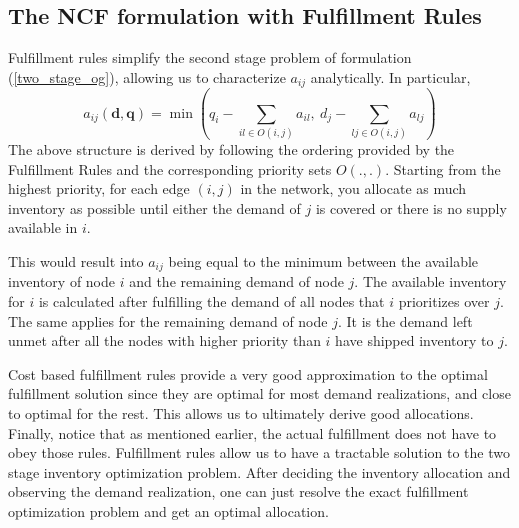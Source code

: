 \documentclass[poms,final,blindrev]{poms1_V1} %
\newcommand{\q}[0]{{\mathbf{q}}}
\renewcommand{\d}[0]{{\mathbf{d}}}
\begin{document}

\subsection{The NCF formulation with Fulfillment Rules}
\label{section:optimal-solution}


Fulfillment rules simplify the second stage problem of formulation (\ref{two_stage_og}), allowing us to characterize $a_{ij}$ analytically. In particular, 
\begin{equation}
\label{simplification_of_aij}
a_{ij}(\d,\q) = \min\left( q_i - \sum_{ il \in O(i,j)} a_{il}    ,\   d_j - \sum_{lj \in O(i,j)} a_{lj} \right)
\end{equation}
The above structure is derived by following the ordering provided by the Fulfillment Rules and the corresponding priority sets $O(.,.)$. Starting from the highest priority, for each edge $(i,j)$ in the network, you allocate as much inventory as possible until either the demand of $j$ is covered or there is no supply available in $i$. 

This would result into $a_{ij}$ being equal to the minimum between the available inventory of node $i$ and the remaining demand of node $j$. The available inventory for $i$ is calculated after fulfilling the demand of all nodes that $i$ prioritizes over $j$. The same applies for the remaining demand of node $j$. It is the demand left unmet after all the nodes with higher priority than $i$ have shipped inventory to $j$.

Cost based fulfillment rules provide a very good approximation to the optimal fulfillment solution
since they are optimal for most demand realizations, and close to optimal for the rest. This allows us to ultimately derive good allocations.
Finally, notice that as mentioned earlier, the actual fulfillment does not have to obey those rules. Fulfillment rules allow us to have 
a tractable solution to the two stage inventory optimization problem. 
After deciding the inventory allocation and observing the demand realization, one can just resolve the exact fulfillment optimization problem and get an optimal allocation.
\end{document}
